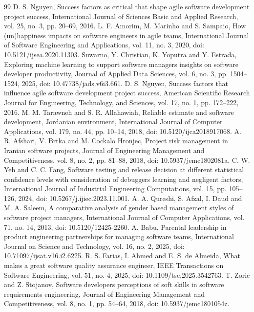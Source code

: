 \documentclass[conference]{IEEEtran}
\begin{document}
\begin{thebibliography}{99}
 D. S. Nguyen, Success factors as critical that shape agile software development project success, International Journal of Sciences Basic and Applied Research, vol. 25, no. 3, pp. 20--69, 2016.
 L. F. Amorim, M. Marinho and S. Sampaio, How (un)happiness impacts on software engineers in agile teams, International Journal of Software Engineering and Applications, vol. 11, no. 3, 2020, doi: 10.5121/ijsea.2020.11303.
 Suwarno, Y. Christian, K. Yoputra and Y. Estrada, Exploring machine learning to support software managers insights on software developer productivity, Journal of Applied Data Sciences, vol. 6, no. 3, pp. 1504--1524, 2025, doi: 10.47738/jads.v6i3.661.
 D. S. Nguyen, Success factors that influence agile software development project success, American Scientific Research Journal for Engineering, Technology, and Sciences, vol. 17, no. 1, pp. 172--222, 2016.
 M. M. Tarawneh and S. R. Allahawiah, Reliable estimate and software development, Jordanian environment, International Journal of Computer Applications, vol. 179, no. 44, pp. 10--14, 2018, doi: 10.5120/ijca2018917068.
 A. R. Afshari, V. Brtka and M. Cockalo Hronjec, Project risk management in Iranian software projects, Journal of Engineering Management and Competitiveness, vol. 8, no. 2, pp. 81--88, 2018, doi: 10.5937/jemc1802081a.
 C. W. Yeh and C. C. Fang, Software testing and release decision at different statistical confidence levels with consideration of debuggers learning and negligent factors, International Journal of Industrial Engineering Computations, vol. 15, pp. 105--126, 2024, doi: 10.5267/j.ijiec.2023.11.001.
 A. A. Qureshi, S. Afzal, I. Daud and M. A. Saleem, A comparative analysis of gender based management styles of software project managers, International Journal of Computer Applications, vol. 71, no. 14, 2013, doi: 10.5120/12425-2260.
 A. Babu, Parental leadership in product engineering partnerships for managing software teams, International Journal on Science and Technology, vol. 16, no. 2, 2025, doi: 10.71097/ijsat.v16.i2.6225.
 R. S. Farias, I. Ahmed and E. S. de Almeida, What makes a great software quality assurance engineer, IEEE Transactions on Software Engineering, vol. 51, no. 4, 2025, doi: 10.1109/tse.2025.3542763.
 T. Zoric and Z. Stojanov, Software developers perceptions of soft skills in software requirements engineering, Journal of Engineering Management and Competitiveness, vol. 8, no. 1, pp. 54--64, 2018, doi: 10.5937/jemc1801054z.

\end{thebibliography}
\end{document}
